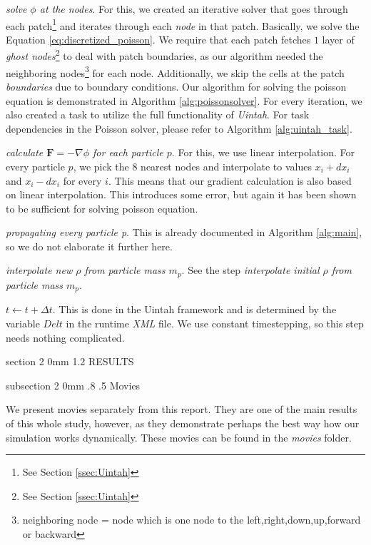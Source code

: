 \documentclass[notitlepage, 12pt]{article}
\makeatletter
\renewcommand{\section}{\@startsection       %
        {section}
        {2}
        {0mm}
        {1.2\baselineskip}
        {\baselineskip}
        {\centering\normalsize}}
\renewcommand{\subsection}{\@startsection    %
        {subsection}
        {2}
        {0mm}
        {.8\baselineskip}
        {.5\baselineskip}
        {\bfseries\normalsize}}
\makeatother
\begin{document}
\emph{solve $\phi$ at the nodes}. For this, we created an iterative solver 
that goes through each patch\footnote{See Section \ref{ssec:Uintah}} and 
iterates through each \emph{node} in that patch. Basically, we solve 
the Equation \ref{eq:discretized_poisson}. We require that each patch 
fetches $1$ layer of \emph{ghost nodes}\footnote{See Section \ref{ssec:Uintah}} 
to deal with patch boundaries, as our algorithm needed the neighboring nodes\footnote{neighboring node = node which is one node to the left,right,down,up,forward or backward} 
for each node. Additionally, we skip the cells at the patch \emph{boundaries} due 
to boundary conditions. Our algorithm for solving the poisson 
equation is demonstrated in Algorithm \ref{alg:poissonsolver}. For every iteration, we also 
created a task to utilize the full functionality of \emph{Uintah}. For task dependencies in the Poisson solver, please refer to Algorithm 
\ref{alg:uintah_task}.

\emph{calculate $\mathbf{F}=-\nabla \phi$ for each particle $p$}. For this, 
we use linear interpolation. For every particle $p$, we pick the $8$ nearest 
nodes and interpolate to values $x_i+dx_i$ and $x_i-dx_i$ for every $i$. 
This means that our gradient calculation is also based on linear interpolation. 
This introduces some error, but again it has been shown to be sufficient 
for solving poisson equation.

\emph{propagating every particle p}. This is already documented in 
Algorithm \ref{alg:main}, so we do not elaborate it further here.

\emph{interpolate new $\rho$ from particle mass $m_p$}. See the step 
\emph{interpolate initial $\rho$ from particle mass $m_p$}.

\emph{$t \gets t + \Delta t$}. This is done in the Uintah framework 
and is determined by the variable $Delt$ in the runtime \emph{XML} file. 
We use constant timestepping, so this step needs nothing complicated.


\section{RESULTS}

\subsection{Movies}

We present movies separately from this report. They are one of the main results of this whole study, however, as they demonstrate 
perhaps the best way how our simulation works dynamically. These movies can be found in the \emph{movies} folder.
\end{document}
